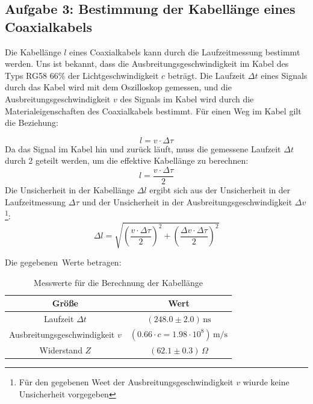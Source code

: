 \documentclass[12pt,a4paper,titlepage]{scrartcl}
\numberwithin{equation}{section}
\numberwithin{table}{section}
\numberwithin{figure}{section}
\begin{document}
\subsection {Aufgabe 3: Bestimmung der Kabellänge eines Coaxialkabels}
Die Kabellänge $l$ eines Coaxialkabels kann durch die Laufzeitmessung bestimmt werden. Uns ist bekannt, dass die Ausbreitungsgeschwindigkeit im Kabel des Typs RG58 66\% der Lichtgeschwindigkeit $c$ beträgt. Die Laufzeit $\Delta t$ eines Signals durch das Kabel wird mit dem Oszilloskop gemessen, und die Ausbreitungsgeschwindigkeit $v$ des Signals im Kabel wird durch die Materialeigenschaften des Coaxialkabels bestimmt. Für einen Weg im Kabel gilt die Beziehung: 

\begin{equation}
    l = v \cdot \Delta \tau
\end{equation}
Da das Signal im Kabel hin und zurück läuft, muss die gemessene Laufzeit $\Delta t$ durch 2 geteilt werden, um die effektive Kabellänge zu berechnen:
\begin{equation}
    l = \frac{v \cdot \Delta \tau}{2}\label{Kabellänge}
\end{equation}
Die Unsicherheit in der Kabellänge $\Delta l$ ergibt sich aus der Unsicherheit in der Laufzeitmessung $\Delta \tau$ und der Unsicherheit in der Ausbreitungsgeschwindigkeit $\Delta v$\footnote{Für den gegebenen Weet der Ausbreitungsgeschwindigkeit $v$ wiurde keine Unsicherheit vorgegeben}:
\begin{equation}
    \Delta l = \sqrt{\left(\frac{v \cdot \Delta \tau}{2}\right)^2 + \left(\frac{\Delta v \cdot \Delta \tau}{2}\right)^2}\label{KabellängeUnsicherheit}
\end{equation}  

Die gegebenen\ Werte betragen:
\begin{table}
    \centering
    \caption{Messwerte für die Berechnung der Kabellänge}
    \begin{tabular}{c|c}
        \toprule
        Größe & Wert\\
        \midrule
        Laufzeit $\Delta t$ & $(248.0 \pm 2.0)\,\text{ns}$ \\
        Ausbreitungsgeschwindigkeit $v$ & $(0.66 \cdot c = 1.98 \cdot 10^8)\,\text{m/s}$ \\
        Widerstand $Z$ & $(62.1 \pm 0.3)\,\Omega$ \\
        \bottomrule
    \end{tabular}
\end{table}
\end{document}
